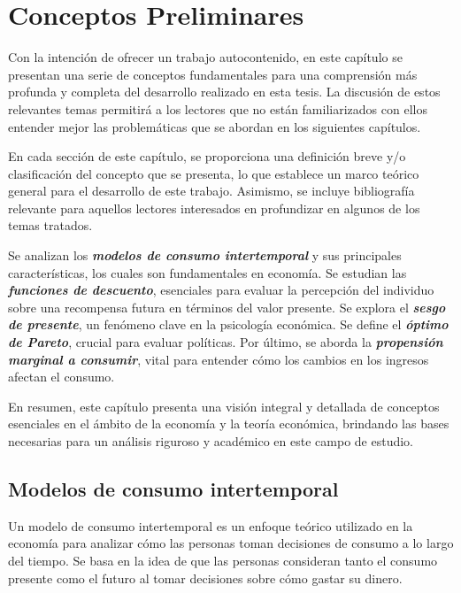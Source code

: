 


\chapter{Conceptos Preliminares} \label{cap_1}

Con la intención de ofrecer un trabajo autocontenido, en este capítulo se presentan una serie de conceptos fundamentales para una comprensión más profunda y completa del desarrollo realizado en esta tesis. La discusión de estos relevantes temas permitirá a los lectores que no están familiarizados con ellos entender mejor las problemáticas que se abordan en los siguientes capítulos.

En cada sección de este capítulo, se proporciona una definición breve y/o clasificación del concepto que se presenta, lo que establece un marco teórico general para el desarrollo de este trabajo. Asimismo, se incluye bibliografía relevante para aquellos lectores interesados en profundizar en algunos de los temas tratados.


Se analizan los \textit{\textbf{modelos de consumo intertemporal}} y sus principales características, los cuales son fundamentales en economía. Se estudian las \textit{\textbf{funciones de descuento}}, esenciales para evaluar la percepción del individuo sobre una recompensa futura en términos del valor presente. Se explora el \textit{\textbf{sesgo de presente}}, un fenómeno clave en la psicología económica. Se define el \textit{\textbf{óptimo de Pareto}}, crucial para evaluar políticas. Por último, se aborda la \textit{\textbf{propensión marginal a consumir}}, vital para entender cómo los cambios en los ingresos afectan el consumo.

En resumen, este capítulo presenta una visión integral y detallada de conceptos esenciales en el ámbito de la economía y la teoría económica, brindando las bases necesarias para un análisis riguroso y académico en este campo de estudio.




\section{Modelos de consumo intertemporal} \label{Sec_spd}

Un modelo de consumo intertemporal \parencite{fisher1930theory,Samuelson37,modigliani1954utility, Strotz55,Laibson97,feigenbaum2021deviation} es un enfoque teórico utilizado en la economía para analizar cómo las personas toman decisiones de consumo a lo largo del tiempo. Se basa en la idea de que las personas consideran tanto el consumo presente como el futuro al tomar decisiones sobre cómo gastar su dinero.

